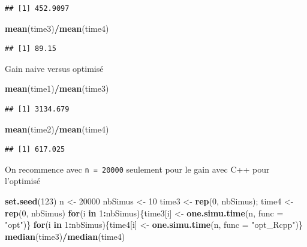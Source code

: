 \documentclass[
]{article}
\newenvironment{Shaded}{\begin{snugshade}}{\end{snugshade}}
\newcommand{\AttributeTok}[1]{\textcolor[rgb]{0.13,0.29,0.53}{#1}}
\newcommand{\ControlFlowTok}[1]{\textcolor[rgb]{0.13,0.29,0.53}{\textbf{#1}}}
\newcommand{\DecValTok}[1]{\textcolor[rgb]{0.00,0.00,0.81}{#1}}
\newcommand{\FunctionTok}[1]{\textcolor[rgb]{0.13,0.29,0.53}{\textbf{#1}}}
\newcommand{\NormalTok}[1]{#1}
\newcommand{\OtherTok}[1]{\textcolor[rgb]{0.56,0.35,0.01}{#1}}
\newcommand{\SpecialCharTok}[1]{\textcolor[rgb]{0.81,0.36,0.00}{\textbf{#1}}}
\newcommand{\StringTok}[1]{\textcolor[rgb]{0.31,0.60,0.02}{#1}}
\begin{document}
\begin{verbatim}
## [1] 452.9097
\end{verbatim}

\begin{Shaded}
\begin{Highlighting}[]
\FunctionTok{mean}\NormalTok{(time3)}\SpecialCharTok{/}\FunctionTok{mean}\NormalTok{(time4)}
\end{Highlighting}
\end{Shaded}

\begin{verbatim}
## [1] 89.15
\end{verbatim}

Gain naive versus optimisé

\begin{Shaded}
\begin{Highlighting}[]
\FunctionTok{mean}\NormalTok{(time1)}\SpecialCharTok{/}\FunctionTok{mean}\NormalTok{(time3)}
\end{Highlighting}
\end{Shaded}

\begin{verbatim}
## [1] 3134.679
\end{verbatim}

\begin{Shaded}
\begin{Highlighting}[]
\FunctionTok{mean}\NormalTok{(time2)}\SpecialCharTok{/}\FunctionTok{mean}\NormalTok{(time4)}
\end{Highlighting}
\end{Shaded}

\begin{verbatim}
## [1] 617.025
\end{verbatim}

On recommence avec \texttt{n\ =\ 20000} seulement pour le gain avec C++
pour l'optimisé

\begin{Shaded}
\begin{Highlighting}[]
\FunctionTok{set.seed}\NormalTok{(}\DecValTok{123}\NormalTok{)}
\NormalTok{n }\OtherTok{\textless{}{-}} \DecValTok{20000}
\NormalTok{nbSimus }\OtherTok{\textless{}{-}} \DecValTok{10}
\NormalTok{time3 }\OtherTok{\textless{}{-}} \FunctionTok{rep}\NormalTok{(}\DecValTok{0}\NormalTok{, nbSimus); time4 }\OtherTok{\textless{}{-}} \FunctionTok{rep}\NormalTok{(}\DecValTok{0}\NormalTok{, nbSimus)}
\ControlFlowTok{for}\NormalTok{(i }\ControlFlowTok{in} \DecValTok{1}\SpecialCharTok{:}\NormalTok{nbSimus)\{time3[i] }\OtherTok{\textless{}{-}} \FunctionTok{one.simu.time}\NormalTok{(n, }\AttributeTok{func =} \StringTok{"opt"}\NormalTok{)\}}
\ControlFlowTok{for}\NormalTok{(i }\ControlFlowTok{in} \DecValTok{1}\SpecialCharTok{:}\NormalTok{nbSimus)\{time4[i] }\OtherTok{\textless{}{-}} \FunctionTok{one.simu.time}\NormalTok{(n, }\AttributeTok{func =} \StringTok{"opt\_Rcpp"}\NormalTok{)\}}
\FunctionTok{median}\NormalTok{(time3)}\SpecialCharTok{/}\FunctionTok{median}\NormalTok{(time4)}
\end{Highlighting}
\end{Shaded}
\end{document}
